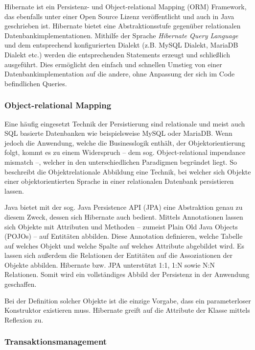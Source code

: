 			Hibernate ist ein Persistenz- und Object-relational Mapping (ORM) Framework, das ebenfalls unter einer Open Source Lizenz veröffentlicht und auch in Java geschrieben ist. Hibernate bietet eine Abstraktionsstufe gegenüber relationalen Datenbankimplementationen. Mithilfe der Sprache \textit{Hibernate Query Language} und dem entsprechend konfigurierten Dialekt (z.B. MySQL Dialekt, MariaDB Dialekt etc.) werden die entsprechenden Statements erzeugt und schließlich ausgeführt. Dies ermöglicht den einfach und schnellen Umstieg von einer Datenbankimplementation auf die andere, ohne Anpassung der sich im Code befindlichen Queries. 
			
			\subsubsection{Object-relational Mapping} %
		
				Eine häufig eingesetzt Technik der Persistierung sind relationale und meist auch SQL basierte Datenbanken wie beispielsweise MySQL oder MariaDB. Wenn jedoch die Anwendung, welche die Businesslogik enthält, der Objektorientierung folgt, kommt es zu einem Widerspruch -- dem sog. Object-relational impendance mismatch --, welcher in den unterschiedlichen Paradigmen begründet liegt. So beschreibt die Objektrelationale Abbildung eine Technik, bei welcher sich Objekte einer objektorientierten Sprache in einer relationalen Datenbank persistieren lassen. 
					
				Java bietet mit der sog. Java Persistence API (JPA) eine Abstraktion genau zu diesem Zweck, dessen sich Hibernate auch bedient. Mittels Annotationen lassen sich Objekte mit Attributen und Methoden -- zumeist Plain Old Java Objects (POJOs) -- auf Entitäten abbilden. Diese Annotation definieren, welche Tabelle auf welches Objekt und welche Spalte auf welches Attribute abgebildet wird. Es lassen sich außerdem die Relationen der Entitäten auf die Assoziationen der Objekte abbilden. Hibernate bzw. JPA unterstützt 1:1, 1:N sowie N:N Relationen. Somit wird ein vollständiges Abbild der Persistenz in der Anwendung geschaffen.
				
				Bei der Definition solcher Objekte ist die einzige Vorgabe, dass ein parameterloser Konstruktor existieren muss. Hibernate greift auf die Attribute der Klasse mittels Reflexion zu. 
				
			\subsubsection{Transaktionsmanagement} %
			
